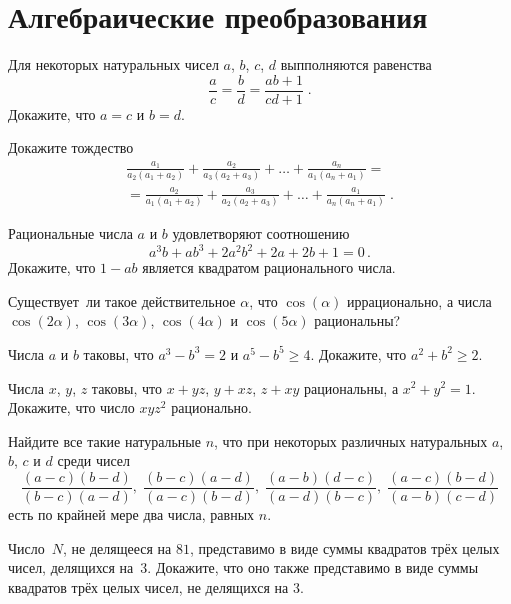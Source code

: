 
\section*{Алгебраические преобразования}

\begin{problems}

\item
Для некоторых натуральных чисел $a$, $b$, $c$, $d$ выпполняются равенства
\[
    \frac{a}{c} = \frac{b}{d} = \frac{a b + 1}{c d + 1}
\;.\]
Докажите, что $a = c$ и $b = d$.

\item
Докажите тождество
\begin{gather*}
    \frac{a_1}{a_2 (a_1 + a_2)} +
    \frac{a_2}{a_3 (a_2 + a_3)}
    + \ldots +
    \frac{a_n}{a_1 (a_n + a_1)}
=\\=
    \frac{a_2}{a_1 (a_1 + a_2)} +
    \frac{a_3}{a_2 (a_2 + a_3)}
    + \ldots +
    \frac{a_1}{a_n (a_n + a_1)}
\;.\end{gather*}


\item
Рациональные числа $a$ и $b$ удовлетворяют соотношению
\[
    a^3 b + a b^3 + 2 a^2 b^2 + 2 a + 2 b + 1
=
    0
\,.\]
Докажите, что $1 - a b$ является квадратом рационального числа.


\item
Существует~ли такое действительное $\alpha$, что $\cos (\alpha)$ иррационально,
а числа $\cos (2 \alpha)$, $\cos (3 \alpha)$, $\cos (4 \alpha)$ и
$\cos (5 \alpha)$ рациональны?


\item
Числа $a$ и $b$ таковы, что $a^3 - b^3 = 2$ и $a^5 - b^5 \geq 4$.
Докажите, что $a^2 + b^2 \geq 2$.

\item
Числа $x$, $y$, $z$ таковы, что $x + y z$, $y + x z$, $z + x y$ рациональны,
а $x^2 + y^2 = 1$.
Докажите, что число $x y z^2$ рационально.

\item
Найдите все такие натуральные $n$, что при некоторых различных натуральных
$a$, $b$, $c$ и $d$ среди чисел
\[
    \frac{(a - c) (b - d)}{(b - c) (a - d)}
,\;
    \frac{(b - c) (a - d)}{(a - c) (b - d)}
,\;
    \frac{(a - b) (d - c)}{(a - d) (b - c)}
,\;
    \frac{(a - c) (b - d)}{(a - b) (c - d)}
\]
есть по крайней мере два числа, равных $n$.

\item
Число~$N$, не делящееся на $81$, представимо в виде суммы квадратов трёх целых
чисел, делящихся на~$3$.
Докажите, что оно также представимо в виде суммы квадратов трёх целых чисел,
не делящихся на $3$.

\end{problems}

